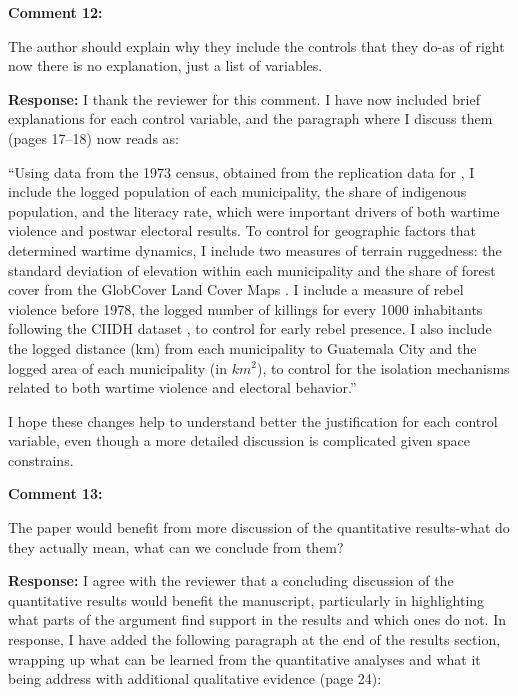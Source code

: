 \documentclass[12pt, a4paper, notitlepage]{article}
\begin{document}
\vspace{15pt}
\noindent\textbf{Comment 12:}
\begin{displayquote}
The author should explain why they include the controls that they do-as of right now there is no explanation, just a list of variables.
\end{displayquote}

\noindent\textbf{Response:} I thank the reviewer for this comment. I have now included brief explanations for each control variable, and the paragraph where I discuss them (pages 17--18) now reads as:

``Using data from the 1973 census, obtained from the replication data for \citet{Sullivan:2012aa}, I include the logged population of each municipality, the share of indigenous population, and the literacy rate, which were important drivers of both wartime violence and postwar electoral results.
To control for geographic factors that determined wartime dynamics, I include two measures of terrain ruggedness: the standard deviation of elevation within each municipality \citep{Mapzen:2018aa} and the share of forest cover from the GlobCover Land Cover Maps \citep{Arino:2012aa}.
I include a measure of rebel violence before 1978, the logged number of killings for every 1000 inhabitants following the CIIDH dataset \citep{Ball:1999aa}, to control for early rebel presence.
I also include the logged distance (km) from each municipality to Guatemala City and the logged area of each municipality (in $km^2$), to control for the isolation mechanisms related to both wartime violence and electoral behavior.''

I hope these changes help to understand better the justification for each control variable, even though a more detailed discussion is complicated given space constrains.

\vspace{15pt}
\noindent\textbf{Comment 13:}
\begin{displayquote}
The paper would benefit from more discussion of the quantitative results-what do they actually mean, what can we conclude from them?
\end{displayquote}

\noindent\textbf{Response:} I agree with the reviewer that a concluding discussion of the quantitative results would benefit the manuscript, particularly in highlighting what parts of the argument find support in the results and which ones do not. In response, I have added the following paragraph at the end of the results section, wrapping up what can be learned from the quantitative analyses and what it being address with additional qualitative evidence (page 24):
\end{document}
